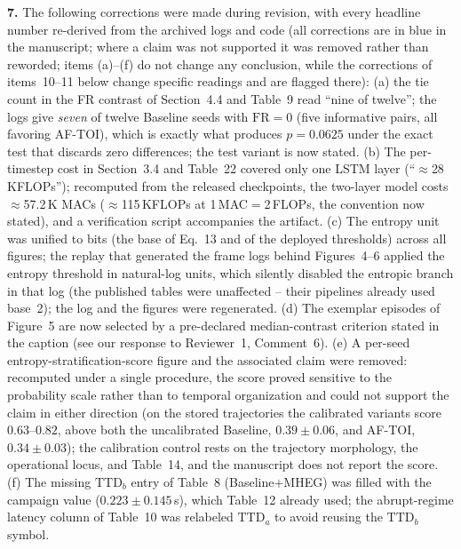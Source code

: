 \documentclass[1p,12pt,authoryear]{elsarticle}
\begin{document}
\noindent \textbf{7.} The following corrections were made during revision, with every headline number re-derived from the archived logs and code (all corrections are in blue in the manuscript; where a claim was not supported it was removed rather than reworded; items (a)--(f) do not change any conclusion, while the corrections of items~10--11 below change specific readings and are flagged there): (a) the tie count in the FR contrast of Section~4.4 and Table~9 read ``nine of twelve''; the logs give \emph{seven} of twelve Baseline seeds with $\mathrm{FR}=0$ (five informative pairs, all favoring AF-TOI), which is exactly what produces $p=0.0625$ under the exact test that discards zero differences; the test variant is now stated. (b) The per-timestep cost in Section~3.4 and Table~22 covered only one LSTM layer (``$\approx$28\,KFLOPs''); recomputed from the released checkpoints, the two-layer model costs $\approx$57.2\,K MACs ($\approx$115\,KFLOPs at 1\,MAC${}={}$2\,FLOPs, the convention now stated), and a verification script accompanies the artifact. (c) The entropy unit was unified to bits (the base of Eq.~13 and of the deployed thresholds) across all figures; the replay that generated the frame logs behind Figures~4--6 applied the entropy threshold in natural-log units, which silently disabled the entropic branch in that log (the published tables were unaffected -- their pipelines already used base~2); the log and the figures were regenerated. (d) The exemplar episodes of Figure~5 are now selected by a pre-declared median-contrast criterion stated in the caption (see our response to Reviewer~1, Comment~6). (e) A per-seed entropy-stratification-score figure and the associated claim were removed: recomputed under a single procedure, the score proved sensitive to the probability scale rather than to temporal organization and could not support the claim in either direction (on the stored trajectories the calibrated variants score $0.63$--$0.82$, above both the uncalibrated Baseline, $0.39 \pm 0.06$, and AF-TOI, $0.34 \pm 0.03$); the calibration control rests on the trajectory morphology, the operational locus, and Table~14, and the manuscript does not report the score. (f) The missing $\mathrm{TTD}_b$ entry of Table~8 (Baseline+MHEG) was filled with the campaign value ($0.223 \pm 0.145$\,s), which Table~12 already used; the abrupt-regime latency column of Table~10 was relabeled $\mathrm{TTD}_a$ to avoid reusing the $\mathrm{TTD}_b$ symbol.
\end{document}
